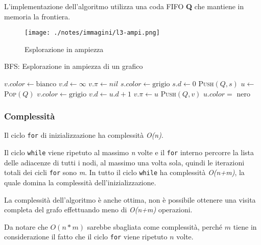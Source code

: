L'implementazione dell'algoritmo utilizza una coda FIFO \textbf{Q} che
mantiene in memoria la frontiera.

\begin{figure}[htbp]
\centering
\texttt{[image: ./notes/immagini/l3-ampi.png]}
\caption{Esplorazione in ampiezza}
\end{figure}

\begin{breakablealgorithm}
	\caption{BFS: Esplorazione in ampiezza di un grafico}
	\begin{algorithmic}[1]
				\State $ v.color \gets \text{bianco} $ 
				\State $ v.d \gets \infty $ 
				\State $ v.\pi \gets nil $
			\EndFor
			\State $ s.color \gets \text{grigio} $
			\State $ s.d \gets 0 $
			\State \textsc{Push}$ (Q,s)$
				\State $ u \gets $ \textsc{Pop}$ (Q) $
						\State $ v.color \gets \text{grigio} $ 
						\State $ v.d \gets u.d + 1 $
						\State $ v.\pi \gets u $
						\State \textsc{Push}$ (Q,v) $
					\EndIf
				\EndFor
				\State $ u.color = $ nero
			\EndWhile
		\EndFunction
	\end{algorithmic}
\end{breakablealgorithm}

\subsubsection{Complessità}\label{complessituxe0}

Il ciclo \texttt{for} di inizializzazione ha complessità \emph{O(n)}.

Il ciclo \texttt{while} viene ripetuto al massimo \emph{n} volte e il
\texttt{for} interno percorre la lista delle adiacenze di tutti i nodi,
al massimo una volta sola, quindi le iterazioni totali dei cicli
\texttt{for} sono \emph{m}. In tutto il ciclo
\texttt{while} ha complessità \emph{O(n+m)}, la quale domina la
complessità dell'inizializzazione.

La complessità dell'algoritmo è anche ottima, non è possibile ottenere
una visita completa del grafo effettuando meno di \emph{O(n+m)}
operazioni.

Da notare che $O(n*m)$ sarebbe sbagliata come complessità, perché $m$
tiene in considerazione il fatto che il ciclo \texttt{for} viene
ripetuto $n$ volte.

